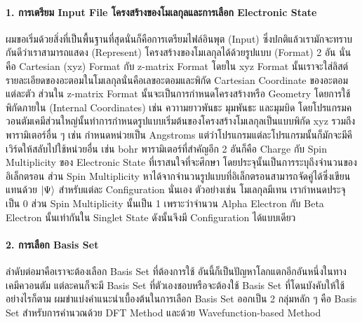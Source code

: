\paragraph{1. การเตรียม Input File โครงสร้างของโมเลกุลและการเลือก Electronic State}
ผมขอเริ่มด้วยสิ่งที่เป็นพื้นฐานที่สุดนั่นก็คือการเตรียมไฟล์อินพุต (Input) ซึ่งปกติแล้วเรามักจะทราบกันดีว่าเราสามารถแสดง (Represent)
โครงสร้างของโมเลกุลได้ด้วยรูปแบบ (Format) 2 อัน นั่นคือ Cartesian (xyz) Format กับ z-matrix Format โดยใน xyz Format
นั้นเราจะใส่ลิสต์รายละเอียดของอะตอมในโมเลกุลนั่นคือเลขอะตอมและพิกัด Cartesian Coordinate ของอะตอมแต่ละตัว ส่วนใน z-matrix
Format นั้นจะเป็นการกำหนดโครงสร้างหรือ Geometry โดยการใช้พิกัดภายใน (Internal Coordinates) เช่น ควาามยาวพันธะ มุมพันธะ
และมุมบิด โดยโปรแกรมควอนตัมเคมีส่วนใหญ่นั้นทำการกำหนดรูปแบบเริ่มต้นของโครงสร้างโมเลกุลเป็นแบบพิกัด xyz รวมถึงพารามิเตอร์อื่น ๆ
เช่น กำหนดหน่วยเป็น Angstroms แต่ว่าโปรแกรมแต่ละโปรแกรมนั้นก็มักจะมีคีเวิร์ดให้สลับไปใช้หน่วยอื่น เช่น bohr พารามิเตอร์ที่สำคัญอีก 2
อันก็คือ Charge กับ Spin Multiplicity ของ Electronic State ที่เราสนใจที่จะศึกษา โดยประจุนั้นเป็นการระบุถึงจำนวนของอิเล็กตรอน
ส่วน Spin Multiplicity หาได้จากจำนวนรูปแบบที่อิเล็กตรอนสามารถจัดคู่ได้ซึ่งเขียนแทนด้วย $\ket{\Psi}$ สำหรับแต่ละ Configuration
นั่นเอง ตัวอย่างเช่น โมเลกุลมีเทน  เรากำหนดประจุเป็น 0 ส่วน Spin Multiplicity นั้นเป็น 1 เพราะว่าจำนวน Alpha Electron
กับ Beta Electron นั้นเท่ากันใน Singlet State ดังนั้นจึงมี Configuration ได้แบบเดียว

\paragraph{2. การเลือก Basis Set}
ลำดับต่อมาคือเราจะต้องเลือก Basis Set ที่ต้องการใช้ อันนี้ก็เป็นปัญหาโลกแตกอีกอันหนึ่งในทางเคมีควอนตัม แต่ละคนก็จะมี Basis Set
ที่ตัวเองชอบหรือจะต้องใช้ Basis Set ที่โดนบังคับให้ใช้ อย่างไรก็ตาม ผมขำแบ่งคำแนะนำเบื้องต้นในการเลือก Basis Set ออกเป็น 2 กลุ่มหลัก ๆ
คือ Basis Set สำหรับการคำนวณด้วย DFT Method และด้วย Wavefunction-based Method

